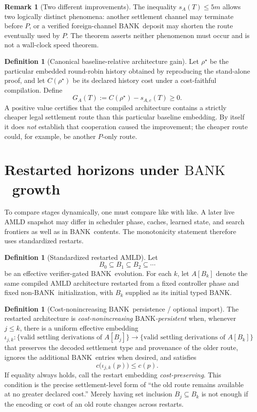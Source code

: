\documentclass[11pt]{article}
\theoremstyle{definition}
\newtheorem{definition}[theorem]{Definition}
\newtheorem{remark}[theorem]{Remark}
\newcommand{\BANK}{\ensuremath{\mathrm{BANK}}}
\begin{document}
\begin{remark}[Two different improvements]
The inequality $s_A(T)\le 5m$ allows two logically distinct phenomena: another settlement channel may terminate before $P$, or a verified foreign-channel \BANK\ deposit may shorten the route eventually used by $P$. The theorem asserts neither phenomenon must occur and is not a wall-clock speed theorem.
\end{remark}

\begin{definition}[Canonical baseline-relative architecture gain]
Let $\rho^\star$ be the particular embedded round-robin history obtained by reproducing the stand-alone proof, and let $C(\rho^\star)$ be its declared history cost under a cost-faithful compilation. Define
\[
G_A(T):=C(\rho^\star)-s_{A,c}(T)\ge 0.
\]
A positive value certifies that the compiled architecture contains a strictly cheaper legal settlement route than this particular baseline embedding. By itself it does \emph{not} establish that cooperation caused the improvement; the cheaper route could, for example, be another $P$-only route.
\end{definition}

\section{Restarted horizons under \BANK\ growth}
To compare stages dynamically, one must compare like with like. A later live AMLD snapshot may differ in scheduler phase, caches, learned state, and search frontiers as well as in \BANK\ contents. The monotonicity statement therefore uses standardized restarts.

\begin{definition}[Standardized restarted AMLD]
Let
\[
B_0\subseteq B_1\subseteq B_2\subseteq\cdots
\]
be an effective verifier-gated \BANK\ evolution. For each $k$, let $A[B_k]$ denote the same compiled AMLD architecture restarted from a fixed controller phase and fixed non-\BANK\ initialization, with $B_k$ supplied as its initial typed \BANK.
\end{definition}

\begin{definition}[Cost-nonincreasing \BANK\ persistence / optional import]
The restarted architecture is \emph{cost-nonincreasing \BANK-persistent} when, whenever $j\le k$, there is a uniform effective embedding
\[
\iota_{j,k}:
\{\text{valid settling derivations of }A[B_j]\}
\longrightarrow
\{\text{valid settling derivations of }A[B_k]\}
\]
that preserves the decoded settlement type and provenance of the older route, ignores the additional \BANK\ entries when desired, and satisfies
\[
c\bigl(\iota_{j,k}(p)\bigr)\le c(p).
\]
If equality always holds, call the restart embedding \emph{cost-preserving}. This condition is the precise settlement-level form of ``the old route remains available at no greater declared cost.'' Merely having set inclusion $B_j\subseteq B_k$ is not enough if the encoding or cost of an old route changes across restarts.
\end{definition}
\end{document}
